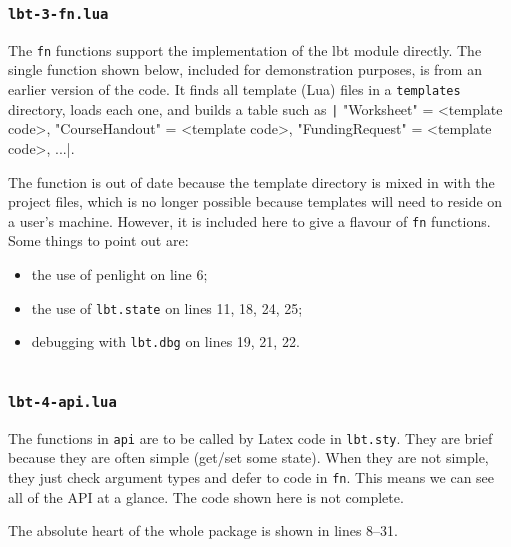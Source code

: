 \documentclass[11pt]{article}
\newcommand{\lbtlabel}{\textsf{lbt}}
\begin{document}
\inputminted{lua}{media/impl-lbt-2-util.lua}


\subsubsection{\texttt{lbt-3-fn.lua}}

The \texttt{fn} functions support the implementation of the \lbtlabel{} module directly. The single function shown below, included for demonstration purposes, is from an earlier version of the code. It finds all template (Lua) files in a \texttt{templates} directory, loads each one, and builds a table such as \texttt|{ "Worksheet" = <template code>, "CourseHandout" = <template code>, "FundingRequest" = <template code>, ...}|.

The function is out of date because the template directory is mixed in with the project files, which is no longer possible because templates will need to reside on a user's machine. However, it is included here to give a flavour of \texttt{fn} functions. Some things to point out are:
\begin{itemize}
  \item the use of \textsf{penlight} on line 6;
  \item the use of \texttt{lbt.state} on lines 11, 18, 24, 25;
  \item debugging with \texttt{lbt.dbg} on lines 19, 21, 22.
\end{itemize}

\inputminted{lua}{media/impl-lbt-3-fn.lua}


\subsubsection{\texttt{lbt-4-api.lua}}

The functions in \texttt{api} are to be called by Latex code in \texttt{lbt.sty}. They are brief because they are often simple (get/set some state). When they are not simple, they just check argument types and defer to code in \texttt{fn}. This means we can see all of the API at a glance. The code shown here is not complete.

The absolute heart of the whole package is shown in lines 8--31.

\inputminted{lua}{media/impl-lbt-4-api.lua}
\end{document}
